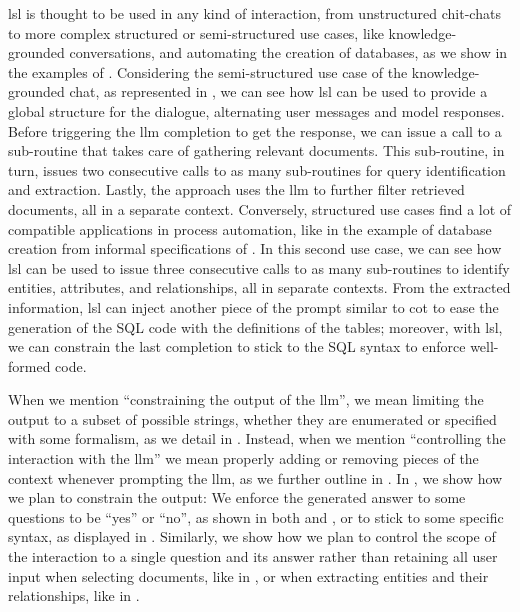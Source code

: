 \documentclass[manuscript,screen]{acmart}
\begin{document}
\ac{lsl} is thought to be used in any kind of interaction, from unstructured chit-chats to more complex structured or semi-structured use cases, like knowledge-grounded conversations, and automating the creation of databases, as we show in the examples of .
Considering the semi-structured use case of the knowledge-grounded chat, as represented in , we can see how \ac{lsl} can be used to provide a global structure for the dialogue, alternating user messages and model responses.
Before triggering the \ac{llm} completion to get the response, we can issue a call to a sub-routine that takes care of gathering relevant documents.
This sub-routine, in turn, issues two consecutive calls to as many sub-routines for query identification and extraction.
Lastly, the approach uses the \ac{llm} to further filter retrieved documents, all in a separate context.
Conversely, structured use cases find a lot of compatible applications in process automation, like in the example of database creation from informal specifications of .
In this second use case, we can see how \ac{lsl} can be used to issue three consecutive calls to as many sub-routines to identify entities, attributes, and relationships, all in separate contexts.
From the extracted information, \ac{lsl} can inject another piece of the prompt similar to \ac{cot} to ease the generation of the SQL code with the definitions of the tables; moreover, with \ac{lsl}, we can constrain the last completion to stick to the SQL syntax to enforce well-formed code.

When we mention \enquote{constraining the output of the \ac{llm}}, we mean limiting the output to a subset of possible strings, whether they are enumerated or specified with some formalism, as we detail in .
Instead, when we mention \enquote{controlling the interaction with the \ac{llm}} we mean properly adding or removing pieces of the context whenever prompting the \ac{llm}, as we further outline in .
In , we show how we plan to constrain the output:
We enforce the generated answer to some questions to be \enquote{yes} or \enquote{no}, as shown in both  and , or to stick to some specific syntax, as displayed in .
Similarly, we show how we plan to control the scope of the interaction to a single question and its answer rather than retaining all user input when selecting documents, like in , or when extracting entities and their relationships, like in .
\end{document}
